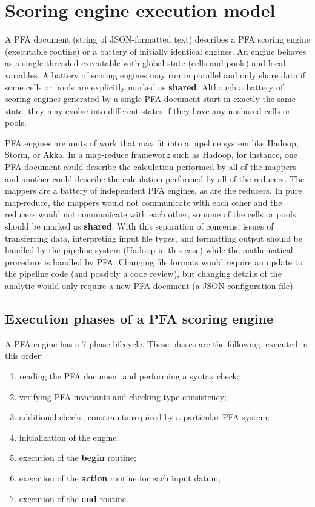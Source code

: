 \documentclass{article}
\newcommand{\PFAc}{\ttfamily\bfseries}
\theoremstyle{definition}
\begin{document}
\pagebreak

\section{Scoring engine execution model}

A PFA document (string of JSON-formatted text) describes a PFA scoring engine (executable routine) or a battery of initially identical engines.  An engine behaves as a single-threaded executable with global state (cells and pools) and local variables.  A battery of scoring engines may run in parallel and only share data if some cells or pools are explicitly marked as {\PFAc shared}.  Although a battery of scoring engines generated by a single PFA document start in exactly the same state, they may evolve into different states if they have any unshared cells or pools.

PFA engines are units of work that may fit into a pipeline system like Hadoop, Storm, or Akka.  In a map-reduce framework such as Hadoop, for instance, one PFA document could describe the calculation performed by all of the mappers and another could describe the calculation performed by all of the reducers.  The mappers are a battery of independent PFA engines, as are the reducers.  In pure map-reduce, the mappers would not communicate with each other and the reducers would not communicate with each other, so none of the cells or pools should be marked as {\PFAc shared}.  With this separation of concerns, issues of transferring data, interpreting input file types, and formatting output should be handled by the pipeline system (Hadoop in this case) while the mathematical procedure is handled by PFA.  Changing file formats would require an update to the pipeline code (and possibly a code review), but changing details of the analytic would only require a new PFA document (a JSON configuration file).

\hypertarget{hsec:phases}{}
\subsection{Execution phases of a PFA scoring engine}
\label{sec:phases}

A PFA engine has a 7 phase lifecycle.  These phases are the following, executed in this order:

\begin{enumerate}
\item reading the PFA document and performing a syntax check;
\item verifying PFA invariants and checking type consistency;
\item additional checks, constraints required by a particular PFA system;
\item initialization of the engine;
\item execution of the {\PFAc begin} routine;
\item execution of the {\PFAc action} routine for each input datum;
\item execution of the {\PFAc end} routine.
\end{enumerate}
\end{document}
